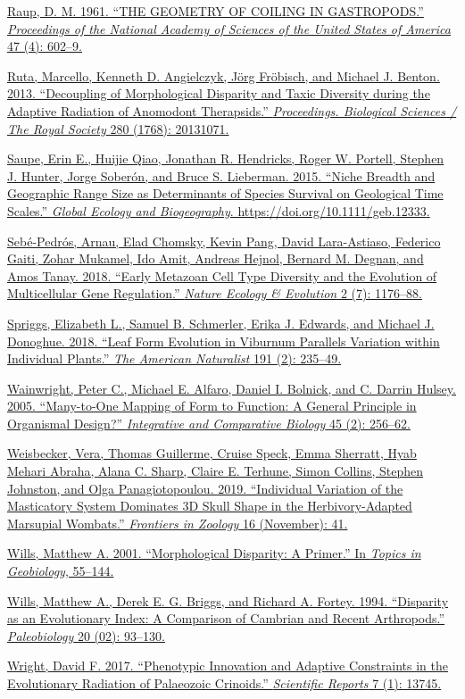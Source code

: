 \href{http://paperpile.com/b/sTGYvp/I0Ic}{Raup, D. M. 1961. ``THE
GEOMETRY OF COILING IN GASTROPODS.'' \emph{Proceedings of the National
Academy of Sciences of the United States of America} 47 (4): 602--9.}

\href{http://paperpile.com/b/sTGYvp/geAO}{Ruta, Marcello, Kenneth D.
Angielczyk, Jörg Fröbisch, and Michael J. Benton. 2013. ``Decoupling of
Morphological Disparity and Taxic Diversity during the Adaptive
Radiation of Anomodont Therapsids.'' \emph{Proceedings. Biological
Sciences / The Royal Society} 280 (1768): 20131071.}

\href{http://paperpile.com/b/sTGYvp/cV3v}{Saupe, Erin E., Huijie Qiao,
Jonathan R. Hendricks, Roger W. Portell, Stephen J. Hunter, Jorge
Soberón, and Bruce S. Lieberman. 2015. ``Niche Breadth and Geographic
Range Size as Determinants of Species Survival on Geological Time
Scales.'' \emph{Global Ecology and Biogeography}.
https://doi.org/}\href{http://dx.doi.org/10.1111/geb.12333}{10.1111/geb.12333}\href{http://paperpile.com/b/sTGYvp/cV3v}{.}

\href{http://paperpile.com/b/sTGYvp/856K}{Sebé-Pedrós, Arnau, Elad
Chomsky, Kevin Pang, David Lara-Astiaso, Federico Gaiti, Zohar Mukamel,
Ido Amit, Andreas Hejnol, Bernard M. Degnan, and Amos Tanay. 2018.
``Early Metazoan Cell Type Diversity and the Evolution of Multicellular
Gene Regulation.'' \emph{Nature Ecology \& Evolution} 2 (7): 1176--88.}

\href{http://paperpile.com/b/sTGYvp/ZEDR}{Spriggs, Elizabeth L., Samuel
B. Schmerler, Erika J. Edwards, and Michael J. Donoghue. 2018. ``Leaf
Form Evolution in Viburnum Parallels Variation within Individual
Plants.'' \emph{The American Naturalist} 191 (2): 235--49.}

\href{http://paperpile.com/b/sTGYvp/Ejzr}{Wainwright, Peter C., Michael
E. Alfaro, Daniel I. Bolnick, and C. Darrin Hulsey. 2005. ``Many-to-One
Mapping of Form to Function: A General Principle in Organismal Design?''
\emph{Integrative and Comparative Biology} 45 (2): 256--62.}

\href{http://paperpile.com/b/sTGYvp/TZzO}{Weisbecker, Vera, Thomas
Guillerme, Cruise Speck, Emma Sherratt, Hyab Mehari Abraha, Alana C.
Sharp, Claire E. Terhune, Simon Collins, Stephen Johnston, and Olga
Panagiotopoulou. 2019. ``Individual Variation of the Masticatory System
Dominates 3D Skull Shape in the Herbivory-Adapted Marsupial Wombats.''
\emph{Frontiers in Zoology} 16 (November): 41.}

\href{http://paperpile.com/b/sTGYvp/nFf7}{Wills, Matthew A. 2001.
``Morphological Disparity: A Primer.'' In \emph{Topics in Geobiology},
55--144.}

\href{http://paperpile.com/b/sTGYvp/eZ3F}{Wills, Matthew A., Derek E. G.
Briggs, and Richard A. Fortey. 1994. ``Disparity as an Evolutionary
Index: A Comparison of Cambrian and Recent Arthropods.''
\emph{Paleobiology} 20 (02): 93--130.}

\href{http://paperpile.com/b/sTGYvp/s33b}{Wright, David F. 2017.
``Phenotypic Innovation and Adaptive Constraints in the Evolutionary
Radiation of Palaeozoic Crinoids.'' \emph{Scientific Reports} 7 (1):
13745.}
